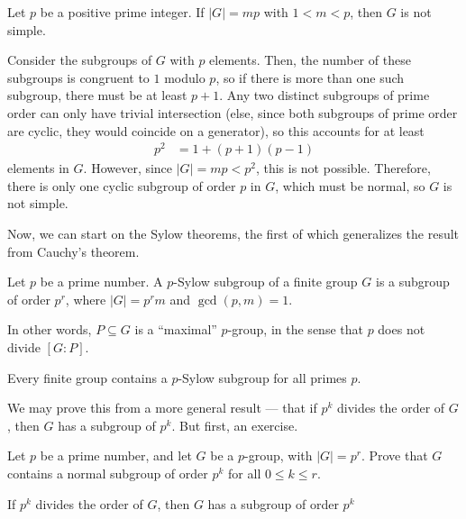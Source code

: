 \documentclass[10pt]{mypackage}
\begin{document}
\begin{example}
  Let $p$ be a positive prime integer. If $\left\vert G \right\vert = mp$ with $1 < m < p$, then $G$ is not simple.\newline

  Consider the subgroups of $G$ with $p$ elements. Then, the number of these subgroups is congruent to $1$ modulo $p$, so if there is more than one such subgroup, there must be at least $p + 1$. Any two distinct subgroups of prime order can only have trivial intersection (else, since both subgroups of prime order are cyclic, they would coincide on a generator), so this accounts for at least
  \begin{align*}
    p^2 &= 1 + \left( p+1 \right)\left( p-1 \right)
  \end{align*}
  elements in $G$. However, since $\left\vert G \right\vert = mp < p^2$, this is not possible. Therefore, there is only one cyclic subgroup of order $p$ in $G$, which must be normal, so $G$ is not simple.
\end{example}
Now, we can start on the Sylow theorems, the first of which generalizes the result from Cauchy's theorem.
\begin{definition}
  Let $p$ be a prime number. A $p$-Sylow subgroup of a finite group $G$ is a subgroup of order $p^{r}$, where $\left\vert G \right\vert = p^{r}m$ and $\gcd\left( p,m \right) = 1$.\newline

  In other words, $P\subseteq G$ is a ``maximal'' $p$-group, in the sense that $p$ does not divide $\left[ G:P \right]$.
\end{definition}
\begin{theorem}
  Every finite group contains a $p$-Sylow subgroup for all primes $p$.
\end{theorem}
We may prove this from a more general result --- that if $p^{k}$ divides the order of $G$, then $G$ has a subgroup of $p^{k}$. But first, an exercise.
\begin{exercise}
  Let $p$ be a prime number, and let $G$ be a $p$-group, with $\left\vert G \right\vert = p^{r}$. Prove that $G$ contains a normal subgroup of order $p^{k}$ for all $0\leq k\leq r$.
\end{exercise}
\begin{proposition}
  If $p^{k}$ divides the order of $G$, then $G$ has a subgroup of order $p^{k}$
\end{proposition}
\end{document}
